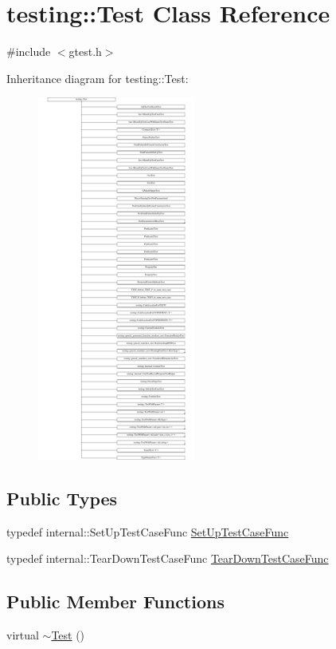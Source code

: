 \hypertarget{classtesting_1_1Test}{}\section{testing\+::Test Class Reference}
\label{classtesting_1_1Test}


{\ttfamily \#include $<$gtest.\+h$>$}

Inheritance diagram for testing\+::Test\+:\begin{figure}[H]
\begin{center}
\leavevmode
\includegraphics[height=12.000000cm]{classtesting_1_1Test}
\end{center}
\end{figure}
\subsection*{Public Types}
\begin{DoxyCompactItemize}
\item 
typedef internal\+::\+Set\+Up\+Test\+Case\+Func \mbox{\hyperlink{classtesting_1_1Test_a5f2a051d1d99c9b784c666c586186cf9}{Set\+Up\+Test\+Case\+Func}}
\item 
typedef internal\+::\+Tear\+Down\+Test\+Case\+Func \mbox{\hyperlink{classtesting_1_1Test_aa0f532e93b9f3500144c53f31466976c}{Tear\+Down\+Test\+Case\+Func}}
\end{DoxyCompactItemize}
\subsection*{Public Member Functions}
\begin{DoxyCompactItemize}
\item 
virtual \mbox{\hyperlink{classtesting_1_1Test_a2b0a62f1e667bbe8d8cb18d785bfa991}{$\sim$\+Test}} ()
\end{DoxyCompactItemize}
